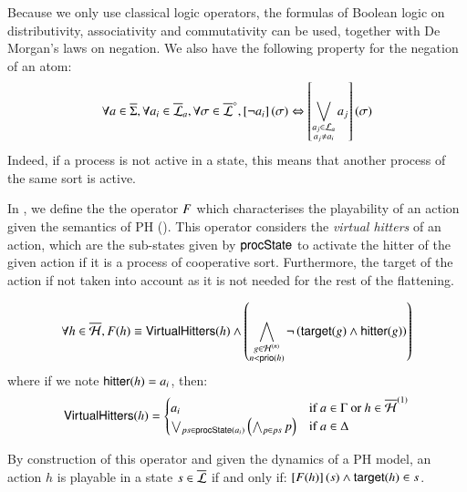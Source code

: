 Because we only use classical logic operators, the formulas of Boolean logic on 
distributivity, associativity and commutativity can be used, together with De Morgan's laws on negation.
We also have the following property for the negation of an atom:
\[\forall a \in \overline{\Sigma}, \forall a_i \in \overline{\mathcal{L}}_a, \forall \sigma \in \overline{\mathcal{L}}^\diamond,
  \left[\neg a_i\right](\sigma) \Leftrightarrow \left[\bigvee_{\substack{a_j \in \mathcal{L}_a\\a_j \neq a_i}} a_j\right](\sigma)\]
Indeed, if a process is not active in a state, this means that another process of the same sort is active.

In , we define the the operator $F$ which characterises the playability of an action
given the semantics of PH ().
This operator considers the \emph{virtual hitters} of an action,
which are the sub-states given by $\mathsf{procState}$ to activate the hitter of the given action if it is a process of cooperative sort.
Furthermore, the target of the action if not taken into account as it is not needed for the rest of the flattening.
%
\begin{definition}\label{def:fop}
  \[\forall h \in \overline{\mathcal{H}}, F(h) \equiv \mathsf{VirtualHitters}(h) \wedge
    \left( \bigwedge_{\substack{g \in \mathcal{H}^{(n)}\\n < \mathsf{prio}(h)}}
    \neg \left( \mathsf{target}(g) \wedge \mathsf{hitter}(g)\right) \right)\]
  where if we note $\mathsf{hitter}(h) = a_i$, then:
  \[\mathsf{VirtualHitters}(h) =
    \begin{cases}
      a_i & \text{if } a \in \Gamma \text{ or } h \in \overline{\mathcal{H}}^{(1)} \\
      \bigvee_{ps \in \mathsf{procState}(a_i)} \left( \bigwedge_{p \in ps} p \right) & \text{if } a \in \Delta
    \end{cases}\]
\end{definition}
%
By construction of this operator and given the dynamics of a PH model,
an action $h$ is playable in a state $s \in \overline{\mathcal{L}}$ if and only if: $\left[F(h)\right](s) \wedge \mathsf{target}(h) \in s$.

